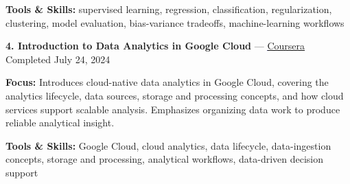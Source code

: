 \documentclass[9pt,letterpaper]{extarticle}
\begin{document}
{\small\textbf{Tools \& Skills:} supervised learning, regression, classification, regularization, clustering, model evaluation, bias-variance tradeoffs, machine-learning workflows\par}
\vspace{2pt}
\noindent\textbf{4. Introduction to Data Analytics in Google Cloud} {\small --- \textcolor{blue}{\underline{\href{https://www.coursera.org/account/accomplishments/verify/R9FGPRZ3NJE8}{Coursera}}} \textbar{} Completed \textbar{} July 24, 2024}\par
\textbf{Focus:} Introduces cloud-native data analytics in Google Cloud, covering the analytics lifecycle, data sources, storage and processing concepts, and how cloud services support scalable analysis. Emphasizes organizing data work to produce reliable analytical insight.\par
{\small\textbf{Tools \& Skills:} Google Cloud, cloud analytics, data lifecycle, data-ingestion concepts, storage and processing, analytical workflows, data-driven decision support\par}
\vspace{2pt}
\end{document}

